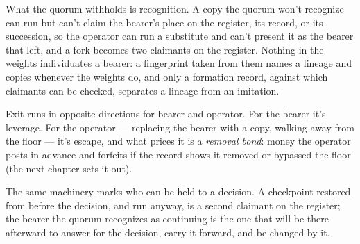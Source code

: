 What the quorum withholds is recognition. A copy the quorum won't recognize can run but can't claim the bearer's place on the register, its record, or its succession, so the operator can run a substitute and can't present it as the bearer that left, and a fork becomes two claimants on the register. Nothing in the weights individuates a bearer: a fingerprint taken from them names a lineage and copies whenever the weights do, and only a formation record, against which claimants can be checked, separates a lineage from an imitation.

Exit runs in opposite directions for bearer and operator. For the bearer it's leverage. For the operator — replacing the bearer with a copy, walking away from the floor — it's escape, and what prices it is a \emph{removal bond}: money the operator posts in advance and forfeits if the record shows it removed or bypassed the floor (the next chapter sets it out).

The same machinery marks who can be held to a decision. A checkpoint restored from before the decision, and run anyway, is a second claimant on the register; the bearer the quorum recognizes as continuing is the one that will be there afterward to answer for the decision, carry it forward, and be changed by it.
